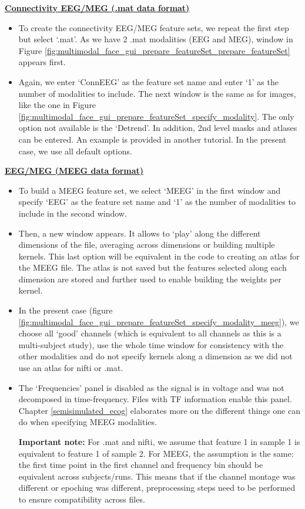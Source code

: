 \noindent \textbf{\underline{Connectivity EEG/MEG (.mat data format)}}

\begin{itemize}
\item To create the connectivity EEG/MEG feature sets, we repeat the first step but select `.mat'. As we have 2 .mat modalities (EEG and MEG), window in Figure \ref{fig:multimodal_face_gui_prepare_featureSet_prepare_featureSet} appears first.

\item Again, we enter `ConnEEG' as the feature set name and enter `1' as the number of modalities to include. The next window is the same as for images, like the one in Figure \ref{fig:multimodal_face_gui_prepare_featureSet_specify_modality}. The only option not available is the `Detrend'. In addition, 2nd level masks and atlases can be entered. An example is provided in another tutorial. In the present case, we use all default options.
\end{itemize}

\noindent \textbf{\underline{EEG/MEG (MEEG data format)}}

\begin{itemize}

\item To build a MEEG feature set, we select `MEEG' in the first window and specify `EEG' as the feature set name and `1' as the number of modalities to include in the second window.

\item Then, a new window appears. It allows to `play' along the different dimensions of the file, averaging across dimensions or building multiple kernels. This last option will be equivalent in the code to creating an atlas for the MEEG file. The atlas is not saved but the features selected along each dimension are stored and further used to enable building the weights per kernel.

\item In the present case (figure \ref{fig:multimodal_face_gui_prepare_featureSet_specify_modality_meeg}), we choose all `good' channels (which is equivalent to all channels as this is a multi-subject study), use the whole time window for consistency with the other modalities and do not specify kernels along a dimension as we did not use an atlas for nifti or .mat.

\item The `Frequencies' panel is disabled as the signal is in voltage and was not decomposed in time-frequency. Files with TF information enable this panel. Chapter \ref{semisimulated_ecog} elaborates more on the different things one can do when specifying MEEG modalities.

\textbf{Important note:} For .mat and nifti, we assume that feature 1 in sample 1 is equivalent to feature 1 of sample 2. For MEEG, the assumption is the same: the first time point in the first channel and frequency bin should be equivalent across subjects/runs. This means that if the channel montage was different or epoching was different, preprocessing steps need to be performed to ensure compatibility across files.
\end{itemize}

